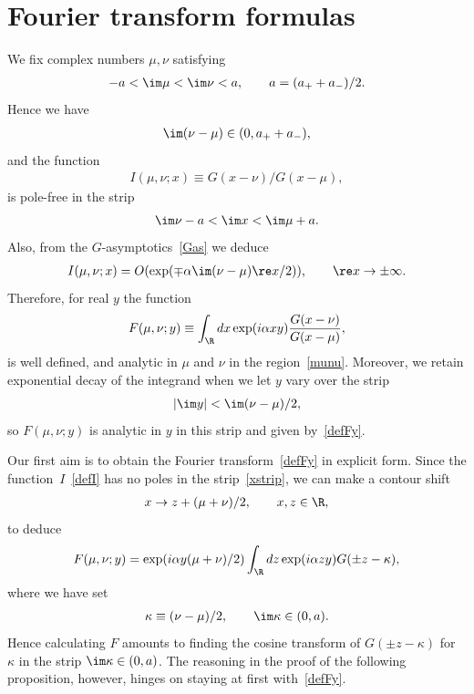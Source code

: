 \section{Fourier transform formulas}\label{appendixC}

We f\/ix complex numbers $\mu,\nu$ satisfying
\begin{gather}\label{munu}
-a<\im \mu<\im \nu <a,\qquad a=(a_{+}+a_{-})/2.
\end{gather}
Hence we have
\begin{gather}
\im (\nu-\mu)\in(0,a_{+}+a_{-}),
\end{gather}
and the function
\begin{gather}\label{defI}
I(\mu,\nu;x)\equiv G(x-\nu)/G(x-\mu),
\end{gather}
is pole-free in the strip
\begin{gather}\label{xstrip}
\im \nu -a<\im x<\im \mu +a.
\end{gather}
Also, from the $G$-asymptotics~\eqref{Gas} we deduce
\begin{gather}
I(\mu,\nu;x)=O(\exp(\mp \alpha\im (\nu -\mu)\re x/2)),\qquad \re x\to\pm\infty.
\end{gather}
Therefore, for real $y$ the function
\begin{gather}\label{defFy}
F(\mu,\nu;y)\equiv \int_{\R}dx \exp(i\alpha xy)\frac{G(x-\nu)}{G(x-\mu)},
\end{gather}
is well def\/ined, and analytic in $\mu$ and $\nu$ in the region~\eqref{munu}. Moreover, we retain exponential decay of the integrand when we let $y$ vary over the strip
\begin{gather}\label{ystrip}
|\im y|<\im(\nu-\mu)/2,
\end{gather}
so $F(\mu,\nu;y)$ is analytic in $y$ in this strip and given by~\eqref{defFy}.

Our f\/irst aim is to obtain the Fourier transform~\eqref{defFy} in explicit form. Since the func\-tion~$I$~\eqref{defI} has no poles in the strip~\eqref{xstrip}, we can make a contour shift
\begin{gather}
x \to z +(\mu+\nu)/2,\qquad x,z\in\R,
\end{gather}
to deduce
\begin{gather}\label{Fkap}
F(\mu,\nu;y)=\exp(i\alpha y(\mu+\nu)/2)\int_{\R}dz \exp(i\alpha zy)G(\pm z-\kappa),
\end{gather}
where we have set
\begin{gather}\label{kappa}
\kappa \equiv (\nu-\mu)/2,\qquad \im \kappa \in(0,a).
\end{gather}
Hence calculating $F$ amounts to f\/inding the cosine transform of $G(\pm z-\kappa)$ for $\kappa$ in the strip $\im \kappa\in(0,a)$. The reasoning in the proof of the following proposition, however, hinges on staying at f\/irst with~\eqref{defFy}.

